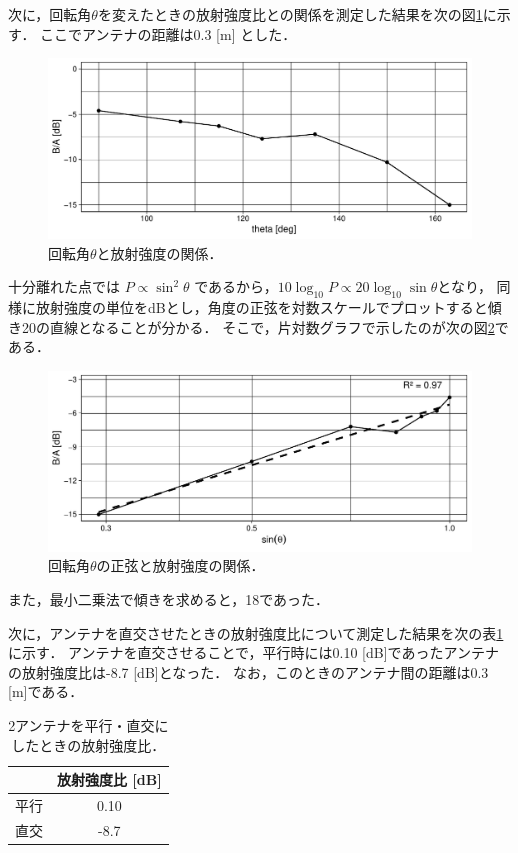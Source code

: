 \documentclass[uplatex,dvipdfmx,a4j,12pt]{jsarticle}
\begin{document}
次に，回転角$\theta$を変えたときの放射強度比との関係を測定した結果を次の図\ref{fig:5-4}に示す．
ここでアンテナの距離は0.3 [m] とした．
\begin{figure}[H]
    \centering
    \includegraphics[width=\linewidth]{data/5_3/gain.pdf}
    \caption{回転角$\theta$と放射強度の関係．}
    \label{fig:5-4}
\end{figure}
十分離れた点では $P \propto \sin^2 \theta$ であるから，$10\log_{10} P \propto 20 \log_{10} \sin \theta$となり，
同様に放射強度の単位をdBとし，角度の正弦を対数スケールでプロットすると傾き20の直線となることが分かる．
そこで，片対数グラフで示したのが次の図\ref{fig:5-5}である．
\begin{figure}[H]
    \centering
    \includegraphics[width=\linewidth]{data/5_3/gain2.pdf}
    \caption{回転角$\theta$の正弦と放射強度の関係．}
    \label{fig:5-5}
\end{figure}
また，最小二乗法で傾きを求めると，18であった．

次に，アンテナを直交させたときの放射強度比について測定した結果を次の表\ref{table:5-1}に示す．
アンテナを直交させることで，平行時には0.10 [dB]であったアンテナの放射強度比は-8.7 [dB]となった．
なお，このときのアンテナ間の距離は0.3 [m]である．
\begin{table}[H]
    \centering
    \caption{2アンテナを平行・直交にしたときの放射強度比．}
    \label{table:5-1}
    \begin{tabular}{cc}
        \hline
        & 放射強度比 [dB]\\
        \hline
        \hline
        平行 & 0.10\\
        直交 & -8.7\\
        \hline
    \end{tabular}
\end{table}
\end{document}
